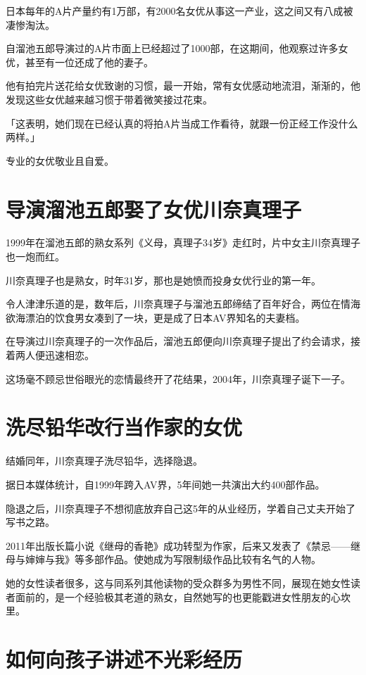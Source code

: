 \documentclass[12pt,UTF8]{ctexbook}
\begin{document}
日本每年的A片产量约有1万部，有2000名女优从事这一产业，这之间又有八成被凄惨淘汰。

自溜池五郎导演过的A片市面上已经超过了1000部，在这期间，他观察过许多女优，甚至有一位还成了他的妻子。

他有拍完片送花给女优致谢的习惯，最一开始，常有女优感动地流泪，渐渐的，他发现这些女优越来越习惯于带着微笑接过花束。

「这表明，她们现在已经认真的将拍A片当成工作看待，就跟一份正经工作没什么两样。」

专业的女优敬业且自爱。

\section{导演溜池五郎娶了女优川奈真理子}

1999年在溜池五郎的熟女系列《义母，真理子34岁》走红时，片中女主川奈真理子也一炮而红。

川奈真理子也是熟女，时年31岁，那也是她愤而投身女优行业的第一年。

令人津津乐道的是，数年后，川奈真理子与溜池五郎缔结了百年好合，两位在情海欲海漂泊的饮食男女凑到了一块，更是成了日本AV界知名的夫妻档。

在导演过川奈真理子的一次作品后，溜池五郎便向川奈真理子提出了约会请求，接着两人便迅速相恋。

这场毫不顾忌世俗眼光的恋情最终开了花结果，2004年，川奈真理子诞下一子。

\section{洗尽铅华改行当作家的女优}

结婚同年，川奈真理子洗尽铅华，选择隐退。

据日本媒体统计，自1999年跨入AV界，5年间她一共演出大约400部作品。

隐退之后，川奈真理子不想彻底放弃自己这5年的从业经历，学着自己丈夫开始了写书之路。

2011年出版长篇小说《继母的香艳》成功转型为作家，后来又发表了《禁忌——继母与婶婶与我》等多部作品。使她成为写限制级作品比较有名气的人物。

她的女性读者很多，这与同系列其他读物的受众群多为男性不同，展现在她女性读者面前的，是一个经验极其老道的熟女，自然她写的也更能戳进女性朋友的心坎里。

\section{如何向孩子讲述不光彩经历}
\end{document}
